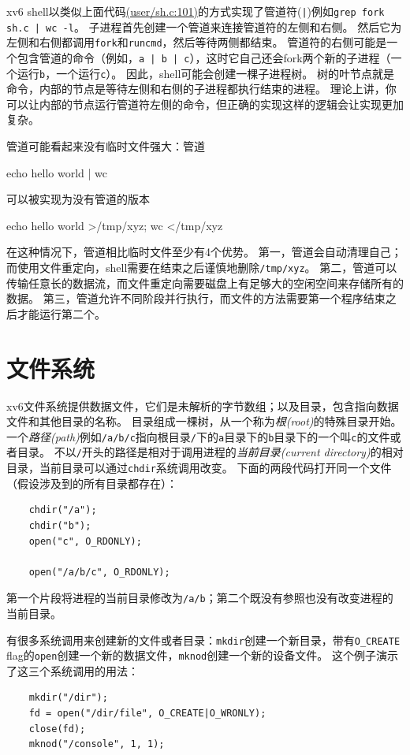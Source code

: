 xv6 shell以类似上面代码\href{https://github.com/mit-pdos/xv6-riscv/blob/riscv//user/sh.c#L101}{(user/sh.c:101)}的方式实现了管道符(\texttt{|})例如\texttt{grep fork sh.c | wc -l}。
子进程首先创建一个管道来连接管道符的左侧和右侧。
然后它为左侧和右侧都调用\texttt{fork}和\texttt{runcmd}，然后等待两侧都结束。
管道符的右侧可能是一个包含管道的命令（例如，\texttt{a | b | c}），这时它自己还会fork两个新的子进程（一个运行\texttt{b}，一个运行\texttt{c}）。
因此，shell可能会创建一棵子进程树。
树的叶节点就是命令，内部的节点是等待左侧和右侧的子进程都执行结束的进程。
理论上讲，你可以让内部的节点运行管道符左侧的命令，但正确的实现这样的逻辑会让实现更加复杂。

管道可能看起来没有临时文件强大：管道
\begin{blacklisting}
    echo hello world | wc    
\end{blacklisting}
可以被实现为没有管道的版本
\begin{blacklisting}
    echo hello world >/tmp/xyz; wc </tmp/xyz
\end{blacklisting}

在这种情况下，管道相比临时文件至少有4个优势。
第一，管道会自动清理自己；而使用文件重定向，shell需要在结束之后谨慎地删除\texttt{/tmp/xyz}。
第二，管道可以传输任意长的数据流，而文件重定向需要磁盘上有足够大的空闲空间来存储所有的数据。
第三，管道允许不同阶段并行执行，而文件的方法需要第一个程序结束之后才能运行第二个。

\section{文件系统}
xv6文件系统提供数据文件，它们是未解析的字节数组；以及目录，包含指向数据文件和其他目录的名称。
目录组成一棵树，从一个称为\emph{根(root)}的特殊目录开始。
一个\emph{路径(path)}例如\texttt{/a/b/c}指向根目录\texttt{/}下的\texttt{a}目录下的\texttt{b}目录下的一个叫\texttt{c}的文件或者目录。
不以\texttt{/}开头的路径是相对于调用进程的\emph{当前目录(current directory)}的相对目录，当前目录可以通过\texttt{chdir}系统调用改变。
下面的两段代码打开同一个文件（假设涉及到的所有目录都存在）：
\begin{lstlisting}
    chdir("/a");
    chdir("b");
    open("c", O_RDONLY);

    open("/a/b/c", O_RDONLY);
\end{lstlisting}
第一个片段将进程的当前目录修改为\texttt{/a/b}；第二个既没有参照也没有改变进程的当前目录。

有很多系统调用来创建新的文件或者目录：\texttt{mkdir}创建一个新目录，带有\texttt{O\_CREATE} flag的\texttt{open}创建一个新的数据文件，\texttt{mknod}创建一个新的设备文件。
这个例子演示了这三个系统调用的用法：
\begin{lstlisting}
    mkdir("/dir");
    fd = open("/dir/file", O_CREATE|O_WRONLY);
    close(fd);
    mknod("/console", 1, 1);
\end{lstlisting}

